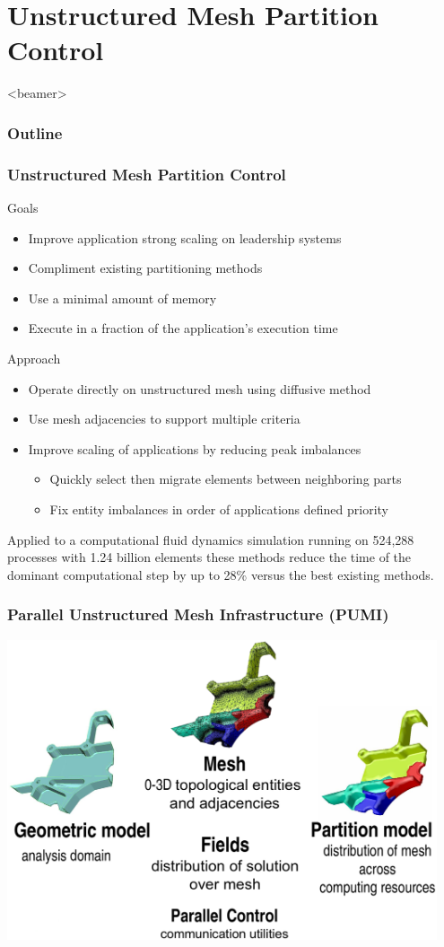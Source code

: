 \documentclass{beamer}
\newcommand{\outline}{
  \begin{frame}<beamer>
    \frametitle{Outline}
    \tableofcontents[currentsection]
  \end{frame}
}
\begin{document}
\section{Unstructured Mesh Partition Control}
\outline
\begin{frame}
  \frametitle{Unstructured Mesh Partition Control}
  Goals
  \begin{itemize}
    \item Improve application strong scaling on leadership systems
    \item Compliment existing partitioning methods
    \item Use a minimal amount of memory
    \item Execute in a fraction of the application's execution time
  \end{itemize}
  Approach
  \begin{itemize}
    \item Operate directly on unstructured mesh using diffusive method
    \item Use mesh adjacencies to support multiple criteria
    \item Improve scaling of applications by reducing peak imbalances
      \begin{itemize}
        \item Quickly select then migrate elements between neighboring parts
        \item Fix entity imbalances in order of applications defined priority
      \end{itemize}
  \end{itemize}
  \bigskip
  Applied to a computational fluid dynamics simulation running on 524,288
  processes with 1.24 billion elements these methods reduce the time of the
  dominant computational step by up to 28\% versus the best existing methods.
\end{frame}

\begin{frame}
  \frametitle{Parallel Unstructured Mesh Infrastructure (PUMI)}
  \includegraphics[width=0.95\textwidth]{figs/pumi.eps}
\end{frame}
\end{document}
